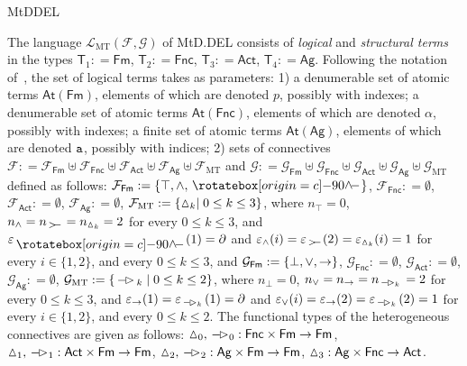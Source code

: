 \begin{entry}{MtDDEL}
\begin{clarifications}
  The language $\mathcal{L}_\mathrm{MT}(\mathcal{F}, \mathcal{G})$ of  MtD.DEL
  consists of  {\em logical}   and {\em structural terms} in the types
  $\mathsf{T}_1:  = \mathsf{Fm}$, 
  $\mathsf{T}_2: = \mathsf{Fnc}$, 
  $\mathsf{T}_3: = \mathsf{Act}$, 
  $\mathsf{T}_4: = \mathsf{Ag}$. 
  Following the notation of~, the set  of logical terms takes as
  parameters:
  1) a denumerable set of atomic terms $\mathsf{At}(\mathsf{Fm})$, elements of
  which are denoted $p$, possibly with indexes; a denumerable  set of atomic terms
  $\mathsf{At}(\mathsf{Fnc})$, elements of which are denoted $\alpha$, possibly
  with indexes; a finite  set of atomic terms $\mathsf{At}(\mathsf{Ag})$, elements
  of which are denoted $\texttt{a}$, possibly with indices; 
  2)  sets of connectives
  $\mathcal{F}: = \mathcal{F}_{\mathsf{Fm}} \uplus
                  \mathcal{F}_{\mathsf{Fnc}} \uplus
                  \mathcal{F}_{\mathsf{Act}} \uplus
                  \mathcal{F}_{\mathsf{Ag}} \uplus
                  \mathcal{F}_{\mathrm{MT}}$
  and 
  $\mathcal{G}: = \mathcal{G}_{\mathsf{Fm}} \uplus
                  \mathcal{G}_{\mathsf{Fnc}} \uplus
                  \mathcal{G}_{\mathsf{Act}} \uplus
                  \mathcal{G}_{\mathsf{Ag}} \uplus
                  \mathcal{G}_{\mathrm{MT}}$
  defined as follows: 
  $\mathcal{F}_{\mathsf{Fm}}: = \{\top, \wedge, \pdra\}$,
  $\mathcal{F}_{\mathsf{Fnc}}: = \emptyset$, 
  $\mathcal{F}_{\mathsf{Act}}: = \emptyset$, 
  $\mathcal{F}_{\mathsf{Ag}}: = \emptyset$,
  $\mathcal{F}_{\mathrm{MT}}: = \{\vartriangle_k\mid 0\leq k\leq 3\}$, 
  where  
  $n_\top = 0$, 
  $n_{\wedge} = n_{\,>\mkern-3.8mu\raisebox{-0.2ex}{\aoll}\,} = n_{\mand_k} = 2$ 
  for every 
  $0\leq k\leq 3$, and 
  $\varepsilon_{\pdra}(1) = \partial$ and
  $\varepsilon_{\wedge}(i)=\varepsilon_{\,>\mkern-3.8mu\raisebox{-0.2ex}{\aoll}\,}(2) = \varepsilon_{\mand_k}(i)  = 1$ 
  for every $i\in \{1, 2\}$, and every $0\leq k\leq 3$, and 
  $\mathcal{G}_{\mathsf{Fm}}: = \{\bot, \vee, \rightarrow\}$,
  $\mathcal{G}_{\mathsf{Fnc}}: = \emptyset$, 
  $\mathcal{G}_{\mathsf{Act}}: = \emptyset$, 
  $\mathcal{G}_{\mathsf{Ag}}: = \emptyset$,
  $\mathcal{G}_{\mathrm{MT}}: = \{\mbox{$\,-{\mkern-3mu\vartriangleright}\,$}_k\mid 0\leq k\leq 2\}$, 
  where  
  $n_\bot = 0$, 
  $n_{\vee} = n_{\rightarrow} =n_{\,-{\mkern-3mu\vartriangleright}_k\,} = 2$ 
  for every 
  $0\leq k\leq 3$, and 
  $\varepsilon_{\rightarrow}(1) = \varepsilon_{\,-{\mkern-3mu\vartriangleright}_k\,}(1)  =  \partial$ and
  $\varepsilon_{\vee}(i)=\varepsilon_{\rightarrow}(2) = \varepsilon_{\,-{\mkern-3mu\vartriangleright}_k\,}(2) = 1$ 
  for every $i\in \{1, 2\}$, and every $0\leq k\leq 2$.  
  The functional types of the heterogeneous connectives are given as follows:
  ${\vartriangle}_0, {\mbox{$\,-{\mkern-3mu\vartriangleright}\,$}}_{\! 0} : \mathsf{Fnc}
  \times \mathsf{Fm} \to \mathsf{Fm}$, ${\vartriangle}_1, {\mbox{$\,-{\mkern-3mu\vartriangleright}\,$}}_{\! 1}  :  \mathsf{Act}
  \times \mathsf{Fm} \to \mathsf{Fm}$, ${\vartriangle}_2, {\mbox{$\,-{\mkern-3mu\vartriangleright}\,$}}_{\! 2}  : \mathsf{Ag}
  \times \mathsf{Fm} \to \mathsf{Fm}$, ${\vartriangle}_3  :  \mathsf{Ag} \times
  \mathsf{Fnc} \to \mathsf{Act}$.
  

\end{clarifications}
\end{entry}
